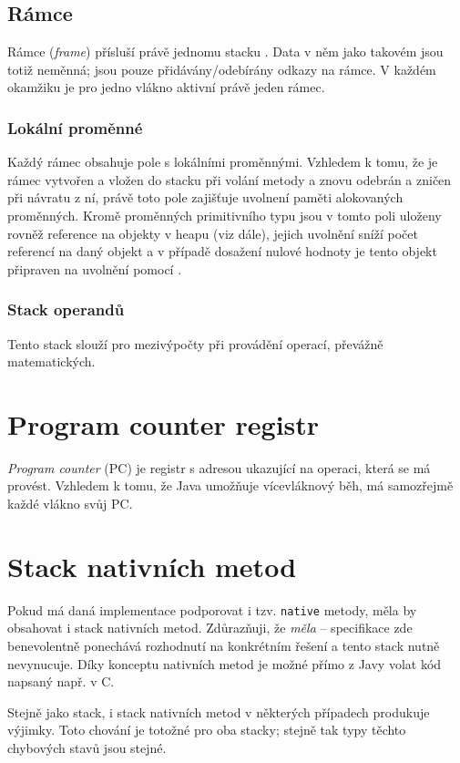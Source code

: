 \subsection{Rámce}
Rámce (\textit{frame}) přísluší právě jednomu stacku \cite{jvms-frames}. Data v něm jako takovém jsou totiž neměnná; jsou pouze přidávány/odebírány odkazy na rámce. V každém okamžiku je pro jedno vlákno aktivní právě jeden rámec. 

\subsubsection{Lokální proměnné}
Každý rámec obsahuje pole s lokálními proměnnými. Vzhledem k tomu, že je rámec vytvořen a vložen do  stacku při volání metody a znovu odebrán a zničen při návratu z ní, právě toto pole zajišťuje uvolnení paměti alokovaných proměnných. Kromě proměnných primitivního typu jsou v tomto poli uloženy rovněž reference na objekty v heapu (viz dále), jejich uvolnění sníží počet referencí na daný objekt a v případě dosažení nulové hodnoty je tento objekt připraven na uvolnění pomocí .

\subsubsection{Stack operandů}
Tento stack slouží pro mezivýpočty při provádění operací, převážně matematických.

\section{Program counter registr}
\textit{Program counter} (PC) je registr s adresou ukazující na operaci, která se má provést. Vzhledem k tomu, že Java umožňuje vícevláknový běh, má samozřejmě každé vlákno svůj PC. 

\section{Stack nativních metod}
Pokud má daná implementace  podporovat i tzv. \texttt{native} metody, měla by obsahovat i stack nativních metod. Zdůrazňuji, že \textit{měla} -- specifikace zde benevolentně ponechává rozhodnutí na konkrétním řešení a tento stack nutně nevynucuje. Díky konceptu nativních metod je možné přímo z Javy volat kód napsaný např. v C. 

Stejně jako  stack, i stack nativních metod v některých případech produkuje výjimky. Toto chování je totožné pro oba stacky; stejně tak typy těchto chybových stavů jsou stejné.

